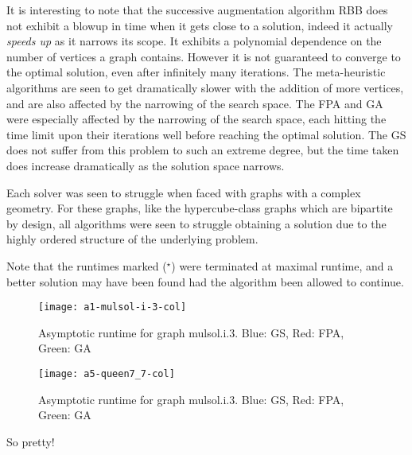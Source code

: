 It is interesting to note that the successive augmentation algorithm RBB does not exhibit a blowup in time when it gets close to a solution, indeed it actually \emph{speeds up} as it narrows its scope. It exhibits a polynomial dependence on the number of vertices a graph contains. However it is not guaranteed to converge to the optimal solution, even after infinitely many iterations. The meta-heuristic algorithms are seen to get dramatically slower with the addition of more vertices, and are also affected by the narrowing of the search space. The FPA and GA were especially affected by the narrowing of the search space, each hitting the time limit upon their iterations well before reaching the optimal solution. The GS does not suffer from this problem to such an extreme degree, but the time taken does increase dramatically as the solution space narrows.

Each solver was seen to struggle when faced with graphs with a complex geometry. For these graphs, like the hypercube-class graphs which are bipartite by design, all algorithms were seen to struggle obtaining a solution due to the highly ordered structure of the underlying problem.

Note that the runtimes marked ($^\star$) were terminated at maximal runtime, and a better solution may have been found had the algorithm been allowed to continue.

\begin{figure}[H]
\caption{Asymptotic runtime for graph mulsol.i.3. Blue: GS, Red: FPA, Green: GA}
\centering
\texttt{[image: a1-mulsol-i-3-col]}
\end{figure}

\begin{figure}[H]
\caption{Asymptotic runtime for graph mulsol.i.3. Blue: GS, Red: FPA, Green: GA}
\centering
\texttt{[image: a5-queen7\_7-col]}
\end{figure}

So pretty!

